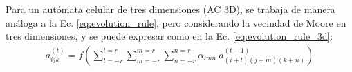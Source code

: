 Para un autómata celular de tres dimensiones (AC 3D), se trabaja de manera análoga a la Ec. \ref{eq:evolution_rule}, pero considerando la vecindad de Moore en tres dimensiones, y se puede expresar como en la Ec. \ref{eq:evolution_rule_3d}:
\begin{equation}
    \label{eq:evolution_rule_3d}
    \begin{aligned}
        a_{ijk}^{(t)} = f(\sum^{l=r}_{l=-r}\sum^{m=r}_{m=-r}\sum^{n=r}_{n=-r}{\alpha_{lmn}\ a_{(i+l)(j+m)(k+n)}^{(t-1)}})
    \end{aligned}
\end{equation}